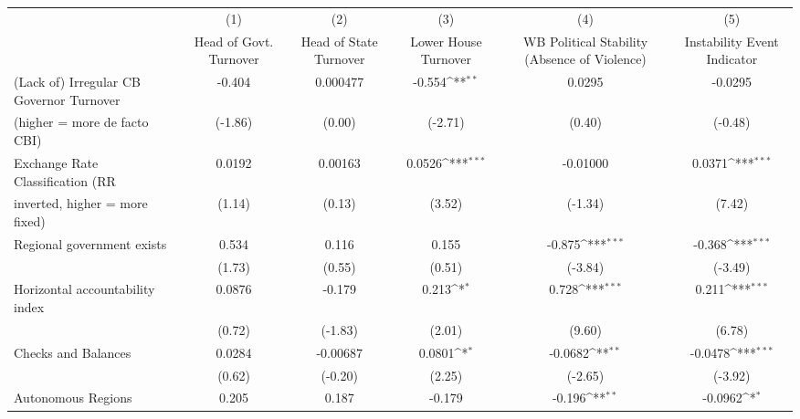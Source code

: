 {
\def\sym#1{\ifmmode^{#1}\else\(^{#1}\)\fi}
\begin{tabular}{l*{5}{c}}
\toprule
                                        &\multicolumn{1}{c}{(1)}&\multicolumn{1}{c}{(2)}&\multicolumn{1}{c}{(3)}&\multicolumn{1}{c}{(4)}&\multicolumn{1}{c}{(5)}\\
                                        &\multicolumn{1}{c}{Head of Govt. Turnover}&\multicolumn{1}{c}{Head of State Turnover}&\multicolumn{1}{c}{Lower House Turnover}&\multicolumn{1}{c}{WB Political Stability (Absence of Violence)}&\multicolumn{1}{c}{Instability Event Indicator}\\
\midrule
(Lack of) Irregular CB Governor Turnover&    -0.404         &  0.000477         &    -0.554\sym{**} &    0.0295         &   -0.0295         \\
(higher = more de facto CBI)            &   (-1.86)         &    (0.00)         &   (-2.71)         &    (0.40)         &   (-0.48)         \\
\addlinespace
Exchange Rate Classification (RR        &    0.0192         &   0.00163         &    0.0526\sym{***}&  -0.01000         &    0.0371\sym{***}\\
inverted, higher = more fixed)          &    (1.14)         &    (0.13)         &    (3.52)         &   (-1.34)         &    (7.42)         \\
\addlinespace
Regional government exists              &     0.534         &     0.116         &     0.155         &    -0.875\sym{***}&    -0.368\sym{***}\\
                                        &    (1.73)         &    (0.55)         &    (0.51)         &   (-3.84)         &   (-3.49)         \\
\addlinespace
Horizontal accountability index         &    0.0876         &    -0.179         &     0.213\sym{*}  &     0.728\sym{***}&     0.211\sym{***}\\
                                        &    (0.72)         &   (-1.83)         &    (2.01)         &    (9.60)         &    (6.78)         \\
\addlinespace
Checks and Balances                     &    0.0284         &  -0.00687         &    0.0801\sym{*}  &   -0.0682\sym{**} &   -0.0478\sym{***}\\
                                        &    (0.62)         &   (-0.20)         &    (2.25)         &   (-2.65)         &   (-3.92)         \\
\addlinespace
Autonomous Regions                      &     0.205         &     0.187         &    -0.179         &    -0.196\sym{**} &   -0.0962\sym{*}  \\

\end{tabular}}

